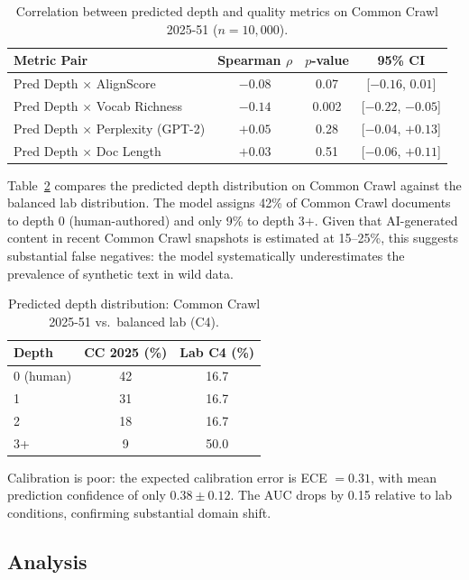\documentclass[11pt,a4paper]{article}
\begin{document}
\begin{table}[t]
\centering
\caption{Correlation between predicted depth and quality metrics on Common Crawl 2025-51 ($n = 10{,}000$).}
\label{tab:cc_correlation}
\small
\begin{tabular}{@{}lccc@{}}
\toprule
Metric Pair & Spearman $\rho$ & $p$-value & 95\% CI \\
\midrule
Pred Depth $\times$ AlignScore        & $-0.08$ & 0.07  & [$-0.16$, $0.01$] \\
Pred Depth $\times$ Vocab Richness    & $-0.14$ & 0.002 & [$-0.22$, $-0.05$] \\
Pred Depth $\times$ Perplexity (GPT-2)& $+0.05$ & 0.28  & [$-0.04$, $+0.13$] \\
Pred Depth $\times$ Doc Length         & $+0.03$ & 0.51  & [$-0.06$, $+0.11$] \\
\bottomrule
\end{tabular}
\end{table}

Table~\ref{tab:cc_distribution} compares the predicted depth distribution on Common Crawl against the balanced lab distribution.
The model assigns 42\% of Common Crawl documents to depth 0 (human-authored) and only 9\% to depth 3+.
Given that AI-generated content in recent Common Crawl snapshots is estimated at 15--25\%, this suggests substantial false negatives: the model systematically underestimates the prevalence of synthetic text in wild data.

\begin{table}[t]
\centering
\caption{Predicted depth distribution: Common Crawl 2025-51 vs.\ balanced lab (C4).}
\label{tab:cc_distribution}
\small
\begin{tabular}{@{}lcc@{}}
\toprule
Depth & CC 2025 (\%) & Lab C4 (\%) \\
\midrule
0 (human)   & 42 & 16.7 \\
1            & 31 & 16.7 \\
2            & 18 & 16.7 \\
3+           & 9  & 50.0 \\
\bottomrule
\end{tabular}
\end{table}

Calibration is poor: the expected calibration error is ECE $= 0.31$, with mean prediction confidence of only $0.38 \pm 0.12$.
The AUC drops by 0.15 relative to lab conditions, confirming substantial domain shift.

\subsection{Analysis}
\end{document}
